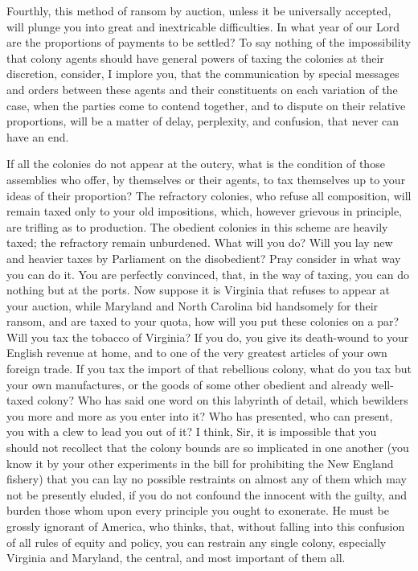 Fourthly, this method of ransom by auction, unless it be universally accepted, will plunge you into great and inextricable difficulties. In what year of our Lord are the proportions of payments to be settled? To say nothing of the impossibility that colony agents should have general powers of taxing the colonies at their discretion, consider, I implore you, that the communication by special messages and orders between these agents and their constituents on each variation of the case, when the parties come to contend together, and to dispute on their relative proportions, will be a matter of delay, perplexity, and confusion, that never can have an end.

If all the colonies do not appear at the outcry, what is the condition of those assemblies who offer, by themselves or their agents, to tax themselves up to your ideas of their proportion? The refractory colonies, who refuse all composition, will remain taxed only to your old impositions, which, however grievous in principle, are trifling as to production. The obedient colonies in this scheme are heavily taxed; the refractory remain unburdened. What will you do? Will you lay new and heavier taxes by Parliament on the disobedient? Pray consider in what way you can do it. You are perfectly convinced, that, in the way of taxing, you can do nothing but at the ports. Now suppose it is Virginia that refuses to appear at your auction, while Maryland and North Carolina bid handsomely for their ransom, and are taxed to your quota, how will you put these colonies on a par? Will you tax the tobacco of Virginia? If you do, you give its death-wound to your English revenue at home, and to one of the very greatest articles of your own foreign trade. If you tax the import of that rebellious colony, what do you tax but your own manufactures, or the goods of some other obedient and already well-taxed colony? Who has said one word on this labyrinth of detail, which bewilders you more and more as you enter into it? Who has presented, who can present, you with a clew to lead you out of it? I think, Sir, it is impossible that you should not recollect that the colony bounds are so implicated in one another (you know it by your other experiments in the bill for prohibiting the New England fishery) that you can lay no possible restraints on almost any of them which may not be presently eluded, if you do not confound the innocent with the guilty, and burden those whom upon every principle you ought to exonerate. He must be grossly ignorant of America, who thinks, that, without falling into this confusion of all rules of equity and policy, you can restrain any single colony, especially Virginia and Maryland, the central, and most important of them all.

